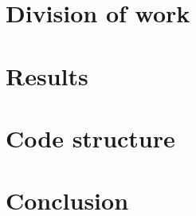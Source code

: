 \documentclass[11pt]{article}
\begin{document}
\begin{multicols}{2}
\section{Division of work}

\section{Results}

\section{Code structure}

\section{Conclusion}

\end{multicols}
\newpage
\begin{thebibliography}{9}

\end{thebibliography}
\newpage
\appendix
\end{document}
